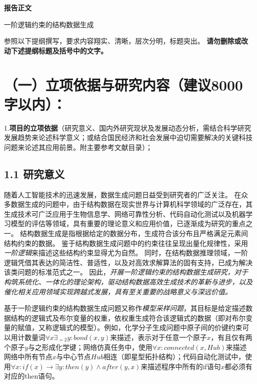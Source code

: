 \documentclass[12pt,UTF8,AutoFakeBold=3,a4paper]{ctexart} %
\begin{document}
\begin{center}
{\sanhao \kaishu \bfseries 报告正文 
\par 一阶逻辑约束的结构数据生成}
\end{center}

{\sihao \kaishu 参照以下提纲撰写，要求内容翔实、清晰，层次分明，标题突出。{\color{MsBlue} \bfseries 请勿删除或改动下述提纲标题及括号中的文字。}}
\vskip -5mm
{\color{MsBlue} \section{（一）立项依据与研究内容（建议8000字以内）：}}

{\sihao \kaishu \color{MsBlue} 1.{\bfseries 项目的立项依据}（研究意义、国内外研究现状及发展动态分析，需结合科学研究发展趋势来论述科学意义；或结合国民经济和社会发展中迫切需要解决的关键科技问题来论述其应用前景。附主要参考文献目录）；}


\subsection{1.1 研究意义}

随着人工智能技术的迅速发展，数据生成问题日益受到研究者的广泛关注。
在众多数据生成的问题中，由于结构数据在现实世界与计算机科学领域的广泛存在，其生成技术可广泛应用于生物信息学、网络可靠性分析、代码自动化测试以及机器学习模型的评估等领域，具有重要的理论意义和应用价值，已逐渐成为研究的重点之一。
结构数据生成是指根据给定的数据分布，生成符合该分布且严格满足元素间结构约束的数据。
鉴于结构数据生成问题中的约束往往呈现出量化规律性，采用\emph{一阶逻辑}来描述这些结构约束显得尤为自然。
同时，在结构数据推理领域，一阶逻辑凭借其表达的简洁性、普适性，以及对高效求解算法的固有支持，已成为解决该类问题的标准范式之一。
因此，\emph{开展一阶逻辑约束的结构数据生成研究，对于构筑系统化、一体化的理论架构，驱动结构数据高效生成技术的革新与进步，以及催化相关应用领域实现跨越式发展，具有至关重要的战略意义与深远价值。}

基于一阶逻辑约束的结构数据生成问题又称作\emph{模型采样问题}，其目标是给定描述数据结构的逻辑式及布尔变量的权重，依权重生成符合该逻辑式的数据（即对布尔变量的赋值，又称逻辑式的模型）。例如，化学分子生成问题中原子间的价键约束可以用计数量词$\forall x\exists_{=2} y: bond(x,y)$来描述，表示对于任意一个原子$x$，有且仅有两个原子$y$与之形成化学键；网络仿真任务中，使用$\forall x: connected(x, Hub)$来描述网络中所有节点$x$与中心节点$Hub$相连（即星型拓扑结构）；代码自动化测试中，使用$\forall x: if(x) \rightarrow \exists y: then(y)\land after(y,x)$来描述程序中所有的if语句$x$都必须有对应的then语句。
\end{document}
